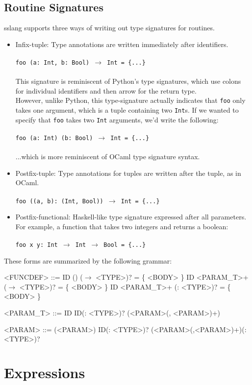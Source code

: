 \documentclass{article}
\begin{document}
\subsection{Routine Signatures}
\noindent sslang supports three ways of writing out type signatures for routines.
\begin{itemize}
    \item Infix-tuple: Type annotations are written immediately after identifiers.\\\\
    \texttt{foo (a: Int, b: Bool) $\rightarrow$ Int = \{...\}}\\\\
    This signature is reminiscent of Python's type signatures, which use colons for individual identifiers and then arrow for the return type.\\
    
    However, unlike Python, this type-signature actually indicates that \texttt{foo} only takes one argument, which is a tuple containing two \texttt{Int}s. If we wanted to specify that \texttt{foo} takes two \texttt{Int} arguments, we'd write the following:\\\\
    \texttt{foo (a: Int) (b: Bool) $\rightarrow$ Int = \{...\}}\\\\
    ...which is more reminiscent of OCaml type signature syntax.
    
    \item Postfix-tuple: Type annotations for tuples are written after the tuple, as in OCaml.\\\\
    \texttt{foo ((a, b): (Int, Bool)) $\rightarrow$ Int = \{...\}}
    \item Postfix-functional: Haskell-like type signature expressed after all parameters. For example, a function that takes two integers and returns a boolean:\\\\
    \texttt{foo x y: Int $\rightarrow$ Int $\rightarrow$ Bool = \{...\}}
\end{itemize}

\noindent These forms are summarized by the following grammar:
\setlength{\grammarindent}{5em}
\begin{grammar}
<FUNCDEF> ::= ID () ($\rightarrow$ <TYPE>)? = \{ <BODY> \}
\alt ID <PARAM_T>+ ($\rightarrow$ <TYPE>)? = \{ <BODY> \}
\alt ID <PARAM_T>+ (: <TYPE>)? = \{ <BODY> \}

<PARAM_T> ::= ID
\alt ID(: <TYPE>)?
\alt (<PARAM>(, <PARAM>)+)

<PARAM> ::= (<PARAM>)
\alt ID(: <TYPE>)?
\alt (<PARAM>(,<PARAM>)+)(: <TYPE>)?
\end{grammar}

\section{Expressions}
\end{document}

